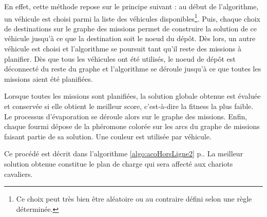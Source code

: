 En effet, cette méthode repose sur le principe suivant : au début de l'algorithme, un véhicule est choisi parmi la liste des véhicules disponibles\footnote{Ce choix peut très bien être aléatoire ou au contraire défini selon une règle déterminée.}. Puis, chaque choix de destinations sur le graphe des missions permet de construire la solution de ce véhicule jusqu'à ce que la destination soit le noeud du dépôt. Dès lors, un autre véhicule est choisi et l'algorithme se poursuit tant qu'il reste des missions à planifier. Dès que tous les véhicules ont été utilisés, le noeud de dépôt est déconnecté du reste du graphe et l'algorithme se déroule jusqu'à ce que toutes les missions aient été planifiées.

Lorsque toutes les missions sont planifiées, la solution globale obtenue est évaluée et conservée si elle obtient le meilleur score, c'est-à-dire la fitness la plus faible. Le processus d'évaporation se déroule alors sur le graphe des missions. Enfin, chaque fourmi dépose de la phéromone colorée sur les arcs du graphe de missions faisant partie de sa solution. Une couleur est utilisée par véhicule.

Ce procédé est décrit dans l'algorithme \ref{algo:acoHorsLigne2} p.\pageref{algo:acoHorsLigne2}. La meilleur solution obtenue constitue le plan de charge qui sera affecté aux chariots cavaliers.

